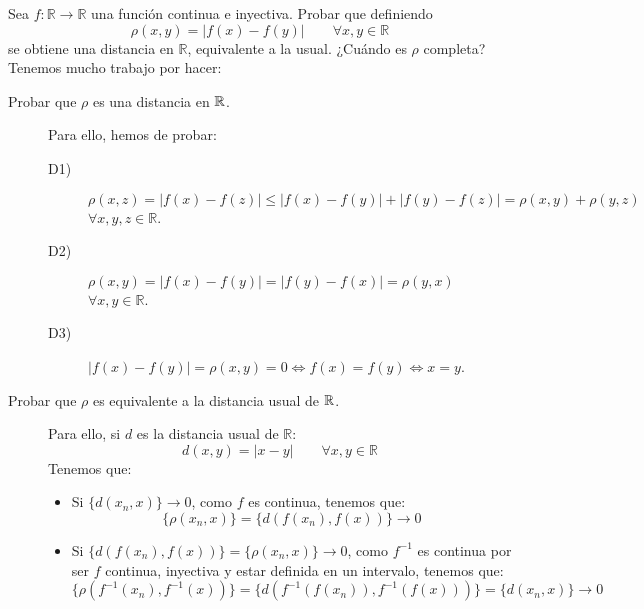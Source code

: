     \begin{ejercicio}
    Sea \( f : \mathbb{R} \rightarrow \mathbb{R} \) una función continua e inyectiva. Probar que definiendo
    \[
    \rho(x,y) = |f(x) - f(y)| \qquad \forall x, y \in \mathbb{R}
    \]
    se obtiene una distancia en \( \mathbb{R} \), equivalente a la usual. ¿Cuándo es \( \rho \) completa?\\

    \noindent
    Tenemos mucho trabajo por hacer:
    \begin{description}
        \item [Probar que $\rho$ es una distancia en $\mathbb{R}$.] Para ello, hemos de probar:
            \begin{description}
                \item [D1)] $\rho(x,z) = |f(x) - f(z)| \leq |f(x) - f(y)| + |f(y) - f(z)| = \rho(x,y) + \rho(y,z)$ $\forall x,y,z\in \mathbb{R}$.
                \item [D2)] $\rho(x,y) = |f(x) - f(y)| = |f(y) - f(x)| = \rho(y,x)$ $\forall x,y\in \mathbb{R}$.
                \item [D3)] $|f(x) - f(y)| = \rho(x,y) = 0 \Longleftrightarrow f(x) = f(y) \Longleftrightarrow x=y$.
            \end{description}
        \item [Probar que $\rho$ es equivalente a la distancia usual de $\mathbb{R}$.] Para ello, si $d$ es la distancia usual de $\mathbb{R}$:
            \begin{equation*}
                d(x,y) = |x-y| \qquad \forall x,y\in \mathbb{R}
            \end{equation*}
            Tenemos que:
            \begin{itemize}
                \item Si $\{d(x_n,x)\}\to 0$, como $f$ es continua, tenemos que:
                    \begin{equation*}
                        \{\rho(x_n,x)\} = \{d(f(x_n),f(x))\} \to 0
                    \end{equation*}
                \item Si $\{d(f(x_n),f(x))\} = \{\rho(x_n,x)\} \to 0$, como $f^{-1}$ es continua por ser $f$ continua, inyectiva y estar definida en un intervalo, tenemos que:
                    \begin{equation*}
                        \{\rho(f^{-1}(x_n), f^{-1}(x) )\} = \{d(f^{-1}(f(x_n)), f^{-1}(f(x)))\} = \{d(x_n,x)\} \to 0
                    \end{equation*}

\end{itemize}
\end{description}
\end{ejercicio}
